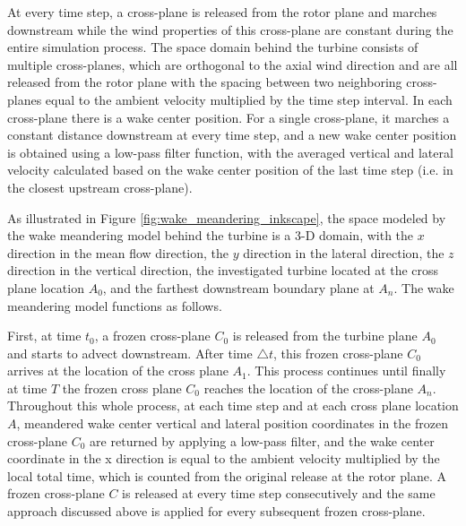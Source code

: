 \documentclass{umthesis}
\begin{document}
At every time step, a cross-plane is released from the rotor plane and marches downstream while the wind properties of this cross-plane are constant during the entire simulation process. The space domain behind the turbine consists of multiple cross-planes, which are orthogonal to the axial wind direction and are all released from the rotor plane with the spacing between two neighboring cross-planes equal to the ambient velocity multiplied by the time step interval. In each cross-plane there is a wake center position. For a single cross-plane, it marches a constant distance downstream at every time step, and a new wake center position is obtained using a low-pass filter function, with the averaged vertical and lateral velocity calculated based on the wake center position of the last time step (i.e. in the closest upstream cross-plane).

As illustrated in Figure \ref{fig:wake_meandering_inkscape}, the space modeled by the wake meandering model behind the turbine is a 3-D domain, with the $x$ direction in the mean flow direction, the $y$ direction in the lateral direction, the $z$ direction in the vertical direction, the investigated turbine located at the cross plane location $A_0$, and the farthest downstream boundary plane at $A_n$. The wake meandering model functions as follows.

First, at time $t_0$, a frozen cross-plane $C_0$ is released from the turbine plane $A_0$ and starts to advect downstream. After time $\triangle t$, this frozen cross-plane $C_0$ arrives at the location of the cross plane $A_1$. This process continues until finally at time $T$ the frozen cross plane $C_0$ reaches the location of the cross-plane $A_n$. Throughout this whole process, at each time step and at each cross plane location $A$, meandered wake center vertical and lateral position coordinates in the frozen cross-plane $C_0$ are returned by applying a low-pass filter, and the wake center coordinate in the x direction is equal to the ambient velocity multiplied by the local total time, which is counted from the original release at the rotor plane. A frozen cross-plane $C$ is released at every time step consecutively and the same approach discussed above is applied for every subsequent frozen cross-plane.
\end{document}
